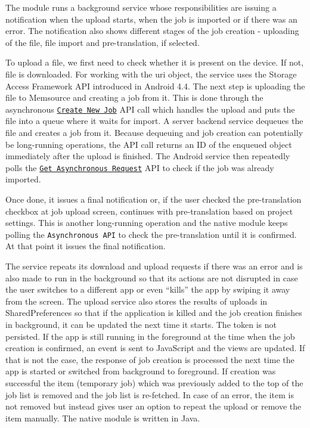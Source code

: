 

The module runs a background service whose responsibilities are issuing a notification when the upload starts, when the job is imported or if there was an error. The notification also shows different stages of the job creation - uploading of the file, file import and pre-translation, if selected. 

To upload a file, we first need to check whether it is present on the device. If not, file is downloaded. For working with the uri object, the service uses the Storage Access Framework API introduced in Android 4.4. The next step is uploading the file to Memsource and creating a job from it. This is done through  the asynchronous \href{http://wiki.memsource.com/wiki/Job_Asynchronous_API_v2#Create_New_Job}{\texttt{Create New Job}} API call which handles the upload and puts the file into a queue where it waits for import. A server backend service dequeues the file and creates a job from it. Because dequeuing and job creation can potentially be long-running operations, the API call returns an ID of the enqueued object immediately after the upload is finished. The Android service then repeatedly polls the \href{http://wiki.memsource.com/wiki/Asynchronous_API_v2#Get_Asynchronous_Request}{\texttt{Get Asynchronous Request}} API to check if the job was already imported.

Once done, it issues a final notification or, if the user checked the pre-translation checkbox at job upload screen, continues with pre-translation based on project settings. This is another long-running operation and the native module keeps polling the \texttt{Asynchronous API} to check the pre-translation until it is confirmed. At that point it issues the final notification.


The service repeats its download and upload requests if there was an error and is also made to run in the background so that its actions are not disrupted in case the user switches to a different app or even “kills” the app by swiping it away from the screen. The upload service also stores the results of uploads in SharedPreferences so that if the application is killed and the job creation finishes in background, it can be updated the next time it starts. The token is not persisted.
If the app is still running in the foreground at the time when the job creation is confirmed, an event is sent to JavaScript and the views are updated. If that is not the case, the response of job creation is processed the next time the app is started or switched from background to foreground. If creation was successful the item (temporary job) which was previously added to the top of the job list is removed and the job list is re-fetched. In case of an error, the item is not removed but instead gives user an option to repeat the upload or remove the item manually. The native module is written in Java. 
 


